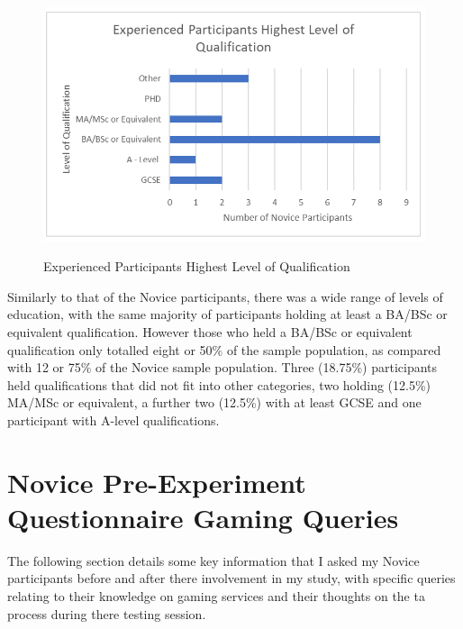 \begin{figure}[H]
\includegraphics[width=\linewidth]{Screenshots/DemographicsQuestionaires/experiencedEducation.png}
\label{ExperiencedQualifications}
\caption{Experienced Participants Highest Level of Qualification}
\end{figure}

Similarly to that of the Novice participants, there was a wide range of levels of education, with the same majority of participants holding at least a BA/BSc or equivalent qualification. However those who held a BA/BSc or equivalent qualification only totalled eight or 50\% of the sample population, as compared with 12 or 75\% of the Novice sample population. Three (18.75\%) participants held qualifications that did not fit into other categories, two holding (12.5\%) MA/MSc or equivalent, a further two (12.5\%) with at least GCSE and one participant with A-level qualifications. 

\section{Novice Pre-Experiment Questionnaire Gaming Queries}
The following section details some key information that I asked my Novice participants before and after there involvement in my study, with specific queries relating to their knowledge on gaming services and their thoughts on the \gls{ta} process during there testing session.

